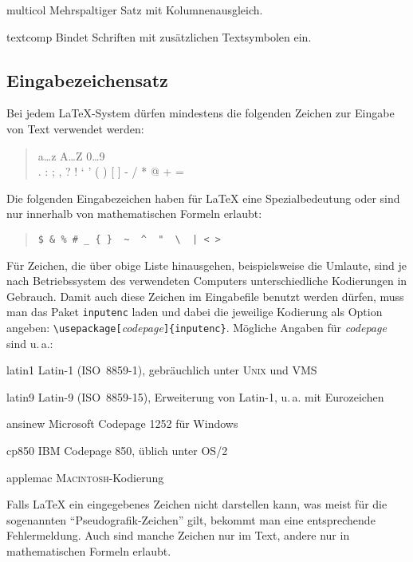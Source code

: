 \begin{table}[htbp]
\begin{lminipage}{11cm}
\begin{ttdescription}
\item[multicol] Mehrspaltiger Satz mit Kolumnenausgleich.
\item[textcomp] Bindet Schriften mit zusätzlichen Textsymbolen ein.
\end{ttdescription}
\end{lminipage}
\end{table}


\subsection{Eingabezeichensatz}\label{inputenc}

Bei jedem \LaTeX-System dürfen mindestens die folgenden
Zeichen zur Eingabe von Text verwendet werden:
\begin{quote}
  \ttfamily
  a\dots z A\dots Z 0\dots 9 \\
  . : ; , ? ! ` ' ( ) [ ] - / * @ + =
\end{quote}
Die folgenden Eingabezeichen haben für \LaTeX{} eine Spezialbedeutung
oder sind nur innerhalb von mathematischen Formeln erlaubt:
\begin{quote}
\verb.$ & % # _ { }  ~  ^  "  \  | < >.
\end{quote}
Für Zeichen, die über obige Liste hinausgehen, beispielsweise die Umlaute,
sind je nach Betriebssystem des verwendeten Computers 
unterschiedliche Kodierungen in Gebrauch.  Damit auch diese Zeichen im 
Eingabefile benutzt werden dürfen,  muss man das Paket 
\texttt{inputenc} laden und dabei die jeweilige Kodierung als 
Option angeben: \verb:\usepackage[:\textit{codepage}\verb:]{inputenc}:.
Mögliche Angaben für \textit{codepage} sind u.\,a.:
\begin{ttdescription}
  \item[latin1] Latin-1 (ISO~8859-1), gebräuchlich unter \textsc{Unix} und VMS
  \item[latin9] Latin-9 (ISO~8859-15), Erweiterung von Latin-1, u.\,a. mit Eurozeichen
  \item[ansinew] Microsoft Codepage 1252 für Windows
  \item[cp850] IBM Codepage 850, üblich unter OS/2
  \item[applemac] \textsc{Macintosh}-Kodierung
\end{ttdescription}
Falls \LaTeX{} ein eingegebenes Zeichen nicht darstellen
kann, was meist für die sogenannten "`Pseudografik-Zeichen"' 
gilt,  bekommt man eine entsprechende Fehlermeldung.
Auch sind manche Zeichen nur im Text, andere nur in mathematischen 
Formeln erlaubt.

